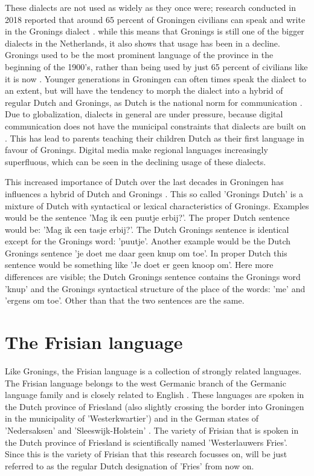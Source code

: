 \documentclass[
10pt, %
a4paper, %
oneside, %
headinclude,footinclude, %
] {book}%
\begin{document}
These dialects are not used as widely as they once were; research conducted in 2018 reported that around 65 percent of Groningen civilians can speak and write in the Gronings dialect \citep{Sprekers}. while this means that Gronings is still one of the bigger dialects in the Netherlands, it also shows that usage has been in a decline. Gronings used to be the most prominent language of the province in the beginning of the 1900's, rather than being used by just 65 percent of civilians like it is now \citep{Sprekers}. Younger generations in Groningen can often times speak the dialect to an extent, but will have the tendency to morph the dialect into a hybrid of regular Dutch and Gronings, as Dutch is the national norm for communication \citep{streektalen}. Due to globalization, dialects in general are under pressure, because digital communication does not have the municipal constraints that dialects are built on \citep{globalization}. This has lead to parents teaching their children Dutch as their first language in favour of  Gronings. Digital media make regional languages increasingly superfluous, which can be seen in the declining usage of these dialects.\citep{globalization} 

This increased importance of Dutch over the last decades in Groningen has influences a hybrid of Dutch and Gronings \citep{globalization}. This so called 'Gronings Dutch' is a mixture of Dutch with syntactical or lexical characteristics of Gronings.  Examples would be the sentence 'Mag ik een puutje erbij?'. The proper Dutch sentence would be: 'Mag ik een tasje erbij?'. The Dutch Gronings sentence is identical except for the Gronings word: 'puutje'. Another example would be the Dutch Gronings sentence 'je doet me daar geen knup om toe'. In proper Dutch this sentence would be something like 'Je doet er geen knoop om'. Here more differences are visible; the Dutch Gronings sentence contains the Gronings word 'knup' and the Gronings syntactical structure of the place of the words: 'me' and 'ergens om toe'. Other than that the two sentences are the same.

\section{The Frisian language}
Like Gronings, the Frisian language is a collection of strongly related languages. The Frisian language belongs to the west Germanic branch of the Germanic language family and is closely related to English \citep{streektalen}. These languages are spoken in the Dutch province of Friesland (also slightly crossing the border into Groningen in the municipality of 'Westerkwartier') and in the German states of 'Nedersaksen' and 'Sleeswijk-Holstein' \citep{streektalen}. The variety of Frisian that is spoken in the Dutch province of Friesland is scientifically named 'Westerlauwers Fries'. Since this is the variety of Frisian that this research focusses on, will be just referred to as the regular Dutch designation of 'Fries' from now on. 
\end{document}
